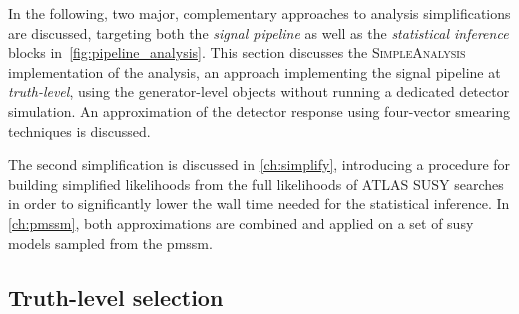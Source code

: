 In the following, two major, complementary approaches to analysis simplifications are discussed, targeting both the \textit{signal pipeline} as well as the \textit{statistical inference} blocks in~\cref{fig:pipeline_analysis}.
This section discusses the \textsc{SimpleAnalysis} implementation of the analysis, an approach implementing the signal pipeline at \textit{truth-level}, \ie using the generator-level objects without running a dedicated detector simulation. An approximation of the detector response using four-vector smearing techniques is discussed.

The second simplification is discussed in \cref{ch:simplify}, introducing a procedure for building simplified likelihoods from the full likelihoods of ATLAS SUSY searches in order to significantly lower the wall time needed for the statistical inference. 
In \cref{ch:pmssm}, both approximations are combined and applied on a set of \gls{susy} models sampled from the \gls{pmssm}.


\subsection{Truth-level selection}\label{sec:truth_selection}

